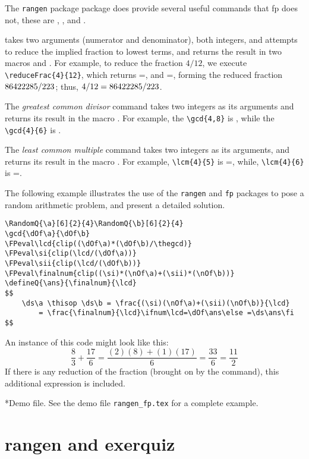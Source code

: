 \documentclass[12pt]{article}
\makeatletter
\renewcommand{\paragraph}
    {\@startsection{paragraph}{4}{0pt}{6pt}{-3pt}{\bfseries}}
\makeatother
\begin{document}
The \texttt{rangen} package package does provide several useful commands that \textsf{fp} does not,
these are , , and .

 takes two arguments (numerator and denominator), both integers, and attempts to reduce the implied fraction
to lowest terms, and returns the result in two macros  and . For example,
to reduce the fraction $4/12$, we execute \verb!\reduceFrac{4}{12}!, which returns =\rfNumer, and
=\rfDenom, forming the reduced fraction $\rfNumer/\rfDenom$; thus,
$4/12 = \rfNumer/\rfDenom$.

The \emph{greatest common divisor} command  takes two integers as its arguments
and returns its result in the macro . For example, the \verb!\gcd{4,8}! is
\thegcd, while the \verb!\gcd{4}{6}! is \thegcd.

The \emph{least common multiple} command  takes two integers as its arguments,
and returns its result in the macro . For example, \verb!\lcm{4}{5}! is
=\thelcm, while, \verb!\lcm{4}{6}! is  =\thelcm.

The following example illustrates the use of the \texttt{rangen} and \texttt{fp} packages to pose a random
arithmetic problem, and present a detailed solution.
\begin{Verbatim}[fontsize=\footnotesize]
\RandomQ{\a}[6]{2}{4}\RandomQ{\b}[6]{2}{4}
\gcd{\dOf\a}{\dOf\b}
\FPeval\lcd{clip((\dOf\a)*(\dOf\b)/\thegcd)}
\FPeval\si{clip(\lcd/(\dOf\a))}
\FPeval\sii{clip(\lcd/(\dOf\b))}
\FPeval\finalnum{clip((\si)*(\nOf\a)+(\sii)*(\nOf\b))}
\defineQ{\ans}{\finalnum}{\lcd}
$$
    \ds\a \thisop \ds\b = \frac{(\si)(\nOf\a)+(\sii)(\nOf\b)}{\lcd}
        = \frac{\finalnum}{\lcd}\ifnum\lcd=\dOf\ans\else =\ds\ans\fi
$$
\end{Verbatim}
An instance of this code might look like this:
$$
    \frac{8}{3}+\frac{17}{6}=\frac{(2)(8)+(1)(17)}{6}=\frac{33}{6}=\frac{11}{2}
$$
If there is any reduction of the fraction (brought on by the  command),
this additional expression is included.

\paragraph*{Demo file.}
See the demo file \texttt{rangen\_fp.tex} for a complete example.

\section{\textsf{rangen} and \textsf{exerquiz}}
\end{document}
